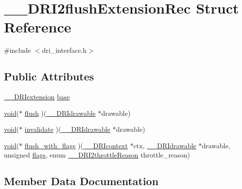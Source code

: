 \hypertarget{struct_____d_r_i2flush_extension_rec}{}\section{\+\_\+\+\_\+\+D\+R\+I2flush\+Extension\+Rec Struct Reference}
\label{struct_____d_r_i2flush_extension_rec}


{\ttfamily \#include $<$dri\+\_\+interface.\+h$>$}

\subsection*{Public Attributes}
\begin{DoxyCompactItemize}
\item 
\hyperlink{dri__interface_8h_a4e0a61c8ece00d2b2c6792a9a1b55385}{\+\_\+\+\_\+\+D\+R\+Iextension} \hyperlink{struct_____d_r_i2flush_extension_rec_a7edd276f3256a548ce5f71724345292d}{base}
\item 
\hyperlink{_s_d_l__opengles2__gl2ext_8h_ae5d8fa23ad07c48bb609509eae494c95}{void}($\ast$ \hyperlink{struct_____d_r_i2flush_extension_rec_abbfae72393667f239298420f80b98093}{flush} )(\hyperlink{dri__interface_8h_a5bfb832a0a08208d95b3bbef439d2262}{\+\_\+\+\_\+\+D\+R\+Idrawable} $\ast$drawable)
\item 
\hyperlink{_s_d_l__opengles2__gl2ext_8h_ae5d8fa23ad07c48bb609509eae494c95}{void}($\ast$ \hyperlink{struct_____d_r_i2flush_extension_rec_af33d43120cc030a112acba4b0b4d60da}{invalidate} )(\hyperlink{dri__interface_8h_a5bfb832a0a08208d95b3bbef439d2262}{\+\_\+\+\_\+\+D\+R\+Idrawable} $\ast$drawable)
\item 
\hyperlink{_s_d_l__opengles2__gl2ext_8h_ae5d8fa23ad07c48bb609509eae494c95}{void}($\ast$ \hyperlink{struct_____d_r_i2flush_extension_rec_a4c6591bd6fa19715fbfbe59d49cf3f17}{flush\+\_\+with\+\_\+flags} )(\hyperlink{dri__interface_8h_a3fd295cba82b5a3d79f1ee7e12bfb908}{\+\_\+\+\_\+\+D\+R\+Icontext} $\ast$ctx, \hyperlink{dri__interface_8h_a5bfb832a0a08208d95b3bbef439d2262}{\+\_\+\+\_\+\+D\+R\+Idrawable} $\ast$drawable, unsigned \hyperlink{glcorearb_8h_ac7ba7d3cce3d19ca020e056b37231289}{flags}, enum \hyperlink{dri__interface_8h_a195f4ef9181a99d4aae51c5ba5ee32aa}{\+\_\+\+\_\+\+D\+R\+I2throttle\+Reason} throttle\+\_\+reason)
\end{DoxyCompactItemize}


\subsection{Member Data Documentation}
\mbox{\label{struct_____d_r_i2flush_extension_rec_a7edd276f3256a548ce5f71724345292d}} 

